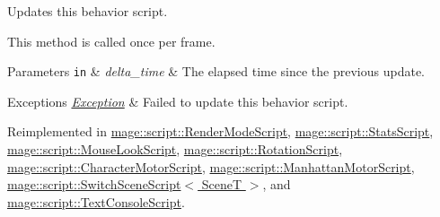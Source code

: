 Updates this behavior script.

This method is called once per frame.


\begin{DoxyParams}[1]{Parameters}
\mbox{\tt in}  & {\em delta\+\_\+time} & The elapsed time since the previous update. \\
\hline
\end{DoxyParams}

\begin{DoxyExceptions}{Exceptions}
{\em \hyperlink{classmage_1_1_exception}{Exception}} & Failed to update this behavior script. \\
\hline
\end{DoxyExceptions}


Reimplemented in \hyperlink{classmage_1_1script_1_1_render_mode_script_afe0bfc54c414c2697dfd2babaccf3b51}{mage\+::script\+::\+Render\+Mode\+Script}, \hyperlink{classmage_1_1script_1_1_stats_script_a0af94632cf9d5c32ae45799a2348c571}{mage\+::script\+::\+Stats\+Script}, \hyperlink{classmage_1_1script_1_1_mouse_look_script_a6d38748c21a6bc475e8ac31e24459053}{mage\+::script\+::\+Mouse\+Look\+Script}, \hyperlink{classmage_1_1script_1_1_rotation_script_a868768482599b478e8fd8afe371b6c54}{mage\+::script\+::\+Rotation\+Script}, \hyperlink{classmage_1_1script_1_1_character_motor_script_a75683c4b8db184174b48dd7e4989c016}{mage\+::script\+::\+Character\+Motor\+Script}, \hyperlink{classmage_1_1script_1_1_manhattan_motor_script_ae7fbaba1da04d00257e5d491868efc53}{mage\+::script\+::\+Manhattan\+Motor\+Script}, \hyperlink{classmage_1_1script_1_1_switch_scene_script_a4915aa35bad8aab3ba024f0babfe4933}{mage\+::script\+::\+Switch\+Scene\+Script$<$ Scene\+T $>$}, and \hyperlink{classmage_1_1script_1_1_text_console_script_afc3d3099761c9c96b1a87ca07f06ddec}{mage\+::script\+::\+Text\+Console\+Script}.

